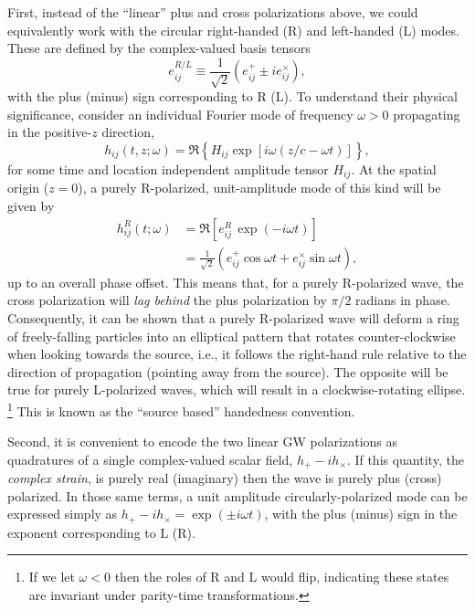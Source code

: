 \documentclass[aps,prd,twocolumn,superscriptaddress,preprintnumbers,floatfix,nofootinbib]{revtex4-2}
\newcommand{\beq}{\begin{equation}}
\newcommand{\eeq}{\end{equation}}
\begin{document}
First, instead of the ``linear'' plus and cross polarizations above, we could equivalently work with the circular right-handed (R) and left-handed (L) modes.
These are defined by the complex-valued basis tensors
\beq
e^{R/L}_{ij} \equiv \frac{1}{\sqrt{2}} \left(e^+_{ij} \pm i e^\times_{ij} \right) ,
\eeq
with the plus (minus) sign corresponding to R (L).
To understand their physical significance, consider an individual Fourier mode of frequency $\omega>0$ propagating in the positive-$z$ direction,
\beq
h_{ij}(t,z; \omega) = \Re \left\{ H_{ij} \exp[ i \omega (z/c - \omega t)]\right\},
\eeq
for some time and location independent amplitude tensor $H_{ij}$.
At the spatial origin ($z=0$), a purely R-polarized, unit-amplitude mode of this kind will be given by
\begin{align}
h_{ij}^R(t;\omega) &= \Re \left[ e^R_{ij}\, \exp(-i\omega t) \right] \nonumber\\
&= \frac{1}{\sqrt{2}} \left( e^+_{ij} \cos \omega t + e^\times_{ij} \sin \omega t \right) ,
\end{align}
up to an overall phase offset.
This means that, for a purely R-polarized wave, the cross polarization will \emph{lag behind} the plus polarization by $\pi/2$ radians in phase.
Consequently, it can be shown that a purely R-polarized wave will deform a ring of freely-falling particles into an elliptical pattern that rotates counter-clockwise when looking towards the source, i.e., it follows the right-hand rule relative to the direction of propagation (pointing away from the source).
The opposite will be true for purely L-polarized waves, which will result in a clockwise-rotating ellipse.%
\footnote{If we let $\omega < 0$ then the roles of R and L would flip, indicating these states are invariant under parity-time transformations.}
This is known as the ``source based'' handedness convention.

Second, it is convenient to encode the two linear GW polarizations as quadratures of a single complex-valued scalar field, $h_+ - i h_\times$.
If this quantity, the \emph{complex strain}, is purely real (imaginary) then the wave is purely plus (cross) polarized.
In those same terms, a unit amplitude circularly-polarized mode can be expressed simply as $h_+ - i h_\times = \exp(\pm i \omega t)$, with the plus (minus) sign in the exponent corresponding to L (R).
\end{document}
